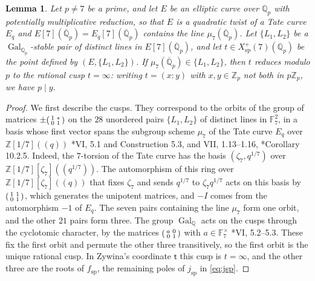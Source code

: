 \documentclass[12pt]{amsart}
\newcommand{\F}{{\mathbb F}}
\newcommand{\Q}{\mathbb{Q}}
\newcommand{\Z}{\mathbb{Z}}
\newcommand{\Qbar}{{\overline{\Q}}}
\renewcommand{\t}{\mathsf{t}}
\DeclareMathOperator{\spc}{sp}
\DeclareMathOperator{\Gal}{Gal}
\numberwithin{equation}{section}
\newtheorem{lemma}[theorem]{Lemma}
\theoremstyle{definition}
\begin{document}
\begin{lemma}
  \label{lem:cusp-reduction}
  Let $p \neq 7$ be a prime, and let $E$ be an elliptic curve over $\Q_p$ with
  potentially multiplicative reduction, so that $E$ is a quadratic twist of a
  Tate curve $E_q$ and $E[7](\Qbar_p) = E_q[7](\Qbar_p)$ contains the line
  $\mu_7(\Qbar_p)$. Let $\{L_1,L_2\}$ be a $\Gal_{\Q_p}$-stable pair of distinct
  lines in $E[7](\Qbar_p)$, and let $t \in X_{\spc}^{+}(7)(\Q_p)$ be the point
  defined by $(E,\{L_1,L_2\})$. If $\mu_7(\Qbar_p) \in \{L_1,L_2\}$, then $t$
  reduces modulo $p$ to the rational cusp $t = \infty$: writing $t = (x:y)$
  with $x, y \in \Z_p$ not both in $p\Z_p$, we have $p \mid y$.
\end{lemma}
\begin{proof}
  We first describe the cusps. They correspond to the orbits of the group of
  matrices $\pm\begin{psmallmatrix*}[r] 1 & \ast \\ 0 & 1\end{psmallmatrix*}$
  on the $28$ unordered pairs $\{L_1,L_2\}$ of distinct lines in $\F_7^2$, in
  a basis whose first vector spans the subgroup scheme $\mu_7$ of the Tate
  curve $E_q$ over $\Z[1/7]((q))$
  \cite{DR-73}*{VI, 5.1 and Construction 5.3, and VII, 1.13--1.16},
  \cite{KM-85}*{Corollary 10.2.5}. Indeed, the $7$-torsion of the Tate curve
  has the basis $(\zeta_7, q^{1/7})$ over $\Z[1/7][\zeta_7]((q^{1/7}))$. The
  automorphism of this ring over $\Z[1/7][\zeta_7]((q))$ that fixes $\zeta_7$
  and sends $q^{1/7}$ to $\zeta_7 q^{1/7}$ acts on this basis by
  $\begin{psmallmatrix*}[r] 1 & 1 \\ 0 & 1\end{psmallmatrix*}$, which generates
  the unipotent matrices, and $-I$ comes from the automorphism $-1$ of $E_q$.
  The seven pairs containing the line $\mu_7$
  form one orbit, and the other $21$ pairs form three. The group $\Gal_{\Q}$ acts
  on the cusps through the cyclotomic character, by the matrices
  $\begin{psmallmatrix*}[r] a & 0 \\ 0 & 1\end{psmallmatrix*}$ with
  $a \in \F_7^{\times}$ \cite{DR-73}*{VI, 5.2--5.3}. These fix the first orbit
  and permute the other three transitively, so the first orbit is the unique
  rational cusp. In Zywina's coordinate $\t$ this cusp is $t = \infty$, and the
  other three are the roots of $f_{\spc}$, the remaining poles of $j_{\spc}$ in
  \cref{eq:jsp}.


\end{proof}
\end{document}
